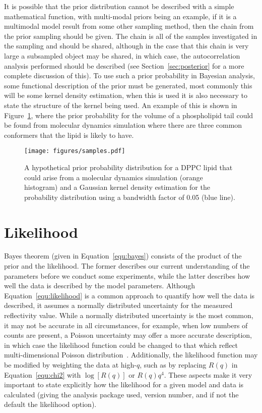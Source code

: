 \documentclass[reprint,superscriptaddress,aps,amsmath]{revtex4-2}
\begin{document}
It is possible that the prior distribution cannot be described with a simple mathematical function, with multi-modal priors being an example, if it is a multimodal model result from some other sampling method, then the chain from the prior sampling should be given. 
The chain is all of the samples investigated in the sampling and should be shared, although in the case that this chain is very large a subsampled object may be shared, in which case, the autocorrelation analysis performed should be described (see Section~\ref{sec:posterior} for a more complete discussion of this).
To use such a prior probability in Bayesian analysis, some functional description of the prior must be generated, most commonly this will be some kernel density estimation, when this is used it is also necessary to state the structure of the kernel being used. 
An example of this is shown in Figure~\ref{fig:samples}, where the prior probability for the volume of a phospholipid tail could be found from molecular dynamics simulation where there are three common conformers that the lipid is likely to have.
%
\begin{figure}
  \texttt{[image: figures/samples.pdf]}
  \caption{
    A hypothetical prior probability distribution for a DPPC lipid that could arise from a molecular dynamics simulation (orange histogram) and a Gaussian kernel density estimation for the probability distribution using a bandwidth factor of \num{0.05} (blue line). 
  }\label{fig:samples}
\end{figure}
%

\section{Likelihood}\label{sec:likelihood}

Bayes theorem (given in Equation~\ref{equ:bayes}) consists of the product of the prior and the likelihood. 
The former describes our current understanding of the parameters before we conduct some experiments, while the latter describes how well the data is described by the model parameters.
Although Equation~\ref{equ:likelihood} is a common approach to quantify how well the data is described, it assumes a normally distributed uncertainty for the measured reflectivity value.
While a normally distributed uncertainty is the most common, it may not be accurate in all circumstances, for example, when low numbers of counts are present, a Poisson uncertainty may offer a more accurate description, in which case the likelihood function could be changed to that which reflect multi-dimensional Poisson distribution~\cite{lass_multinomial_2021}.
Additionally, the likelihood function may be modified by weighting the data at high-$q$, such as by replacing $R(q)$ in Equation~\ref{equ:chi2} with $\log{[R(q)]}$ or $R(q)q^4$.
These aspects make it very important to state explicitly how the likelihood for a given model and data is calculated (giving the analysis package used, version number, and if not the default the likelihood option).
\end{document}
